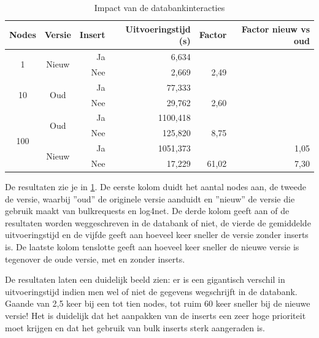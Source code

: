 \begin{table}[h]
\centering
\begin{tabular}{@{}ccrrrr@{}}
\toprule
\multicolumn{1}{l}{Nodes} & \multicolumn{1}{l}{Versie} & Insert & Uitvoeringstijd (s) & Factor & Factor nieuw vs oud \\ \midrule
\multirow{2}{*}{1}        & \multirow{2}{*}{Nieuw}     & Ja     & 6,634               &        &                     \\
                          &                            & Nee    & 2,669               & 2,49   &                     \\
\multirow{2}{*}{10}       & \multirow{2}{*}{Oud}       & Ja     & 77,333              &        &                     \\
                          &                            & Nee    & 29,762              & 2,60   &                     \\
\multirow{4}{*}{100}      & \multirow{2}{*}{Oud}       & Ja     & 1100,418            &        &                     \\
                          &                            & Nee    & 125,820             & 8,75   &                     \\
                          & \multirow{2}{*}{Nieuw}     & Ja     & 1051,373            &        & 1,05                \\
                          &                            & Nee    & 17,229              & 61,02  & 7,30                \\ \bottomrule
\end{tabular}
\caption{Impact van de databankinteracties}
\label{tabel-impact-db}
\end{table}

De resultaten zie je in \cref{tabel-impact-db}.
De eerste kolom duidt het aantal nodes aan, de tweede de versie, waarbij ''oud'' de originele versie aanduidt en ''nieuw'' de versie die gebruik maakt van bulkrequests en log4net.
De derde kolom geeft aan of de resultaten worden weggeschreven in de databank of niet, de vierde de gemiddelde uitvoeringstijd en de vijfde geeft aan hoeveel keer
sneller de versie zonder inserts is.
De laatste kolom tenslotte geeft aan hoeveel keer sneller de nieuwe versie is tegenover de oude versie, met en zonder inserts.

De resultaten laten een duidelijk beeld zien:
er is een gigantisch verschil in uitvoeringstijd indien men wel of niet de gegevens wegschrijft in de databank.
Gaande van 2,5 keer bij een tot tien nodes, tot ruim 60 keer sneller bij de nieuwe versie!
Het is duidelijk dat het aanpakken van de inserts een zeer hoge prioriteit moet krijgen en dat het gebruik van bulk inserts sterk aangeraden is.

